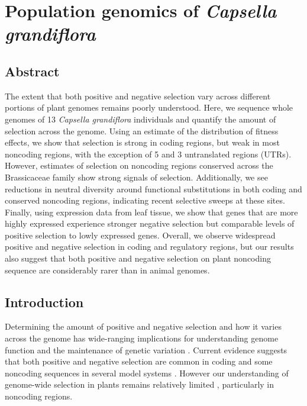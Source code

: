 \setlength{\parindent}{0ex}
\setlength{\parskip}{2ex}

\chapter{Population genomics of \textit{Capsella grandiflora}}

\section{Abstract}
The extent that both positive and negative selection vary across different portions of plant genomes remains poorly understood. Here, we sequence whole genomes of 13 \textit{Capsella grandiflora} individuals and quantify the amount of selection across the genome. Using an estimate of the distribution of fitness effects, we show that selection is strong in coding regions, but weak in most noncoding regions, with the exception of 5\textsc{} and 3\textsc{} untranslated regions (UTRs). However, estimates of selection on noncoding regions conserved across the Brassicaceae family show strong signals of selection. Additionally, we see reductions in neutral diversity around functional substitutions in both coding and conserved noncoding regions, indicating recent selective sweeps at these sites. Finally, using expression data from leaf tissue, we show that genes that are more highly expressed experience stronger negative selection but comparable levels of positive selection to lowly expressed genes. Overall, we observe widespread positive and negative selection in coding and regulatory regions, but our results also suggest that both positive and negative selection on plant noncoding sequence are considerably rarer than in animal genomes.

\section{Introduction}
Determining the amount of positive and negative selection and how it varies across the genome has wide-ranging implications for understanding genome function and the maintenance of genetic variation \citep{keightley2010}. Current evidence suggests that both positive and negative selection are common in coding and some noncoding sequences in several model systems \citep{andolfatto2005,torgerson2009, lindblad2011, arbiza2013, hough2013, zhen2012, Halligan2013}. However our understanding of genome-wide selection in plants remains relatively limited \citep{hough2013}, particularly in noncoding regions. 

